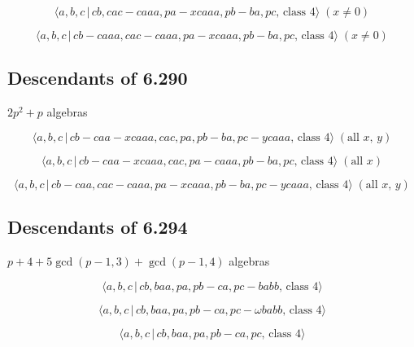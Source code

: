 \documentclass[10pt]{article}
\begin{document}
\begin{equation}
\langle a,b,c\,|\,cb,cac-caaa,pa-xcaaa,pb-ba,pc,\,\text{class }4\rangle \;(x
\neq 0)  \tag{7.2304}
\end{equation}

\begin{equation}
\langle a,b,c\,|\,cb-caaa,cac-caaa,pa-xcaaa,pb-ba,pc,\,\text{class }4\rangle
\;(x \neq 0)  \tag{7.2305}
\end{equation}

\subsection{Descendants of 6.290}

$2p^{2}+p$ algebras

\begin{equation}
\langle a,b,c\,|\,cb-caa-xcaaa,cac,pa,pb-ba,pc-ycaaa,\,\text{class }4\rangle
\;(\text{all }x,\,y)  \tag{7.2306}
\end{equation}

\begin{equation}
\langle a,b,c\,|\,cb-caa-xcaaa,cac,pa-caaa,pb-ba,pc,\,\text{class }4\rangle
\;(\text{all }x)  \tag{7.2307}
\end{equation}

\begin{equation}
\langle a,b,c\,|\,cb-caa,cac-caaa,pa-xcaaa,pb-ba,pc-ycaaa,\,\text{class }%
4\rangle \;(\text{all }x,\,y)  \tag{7.2308}
\end{equation}

\subsection{Descendants of 6.294}

$p+4+5\gcd (p-1,3)+\gcd (p-1,4)$ algebras

\begin{equation}
\langle a,b,c\,|\,cb,baa,pa,pb-ca,pc-babb,\,\text{class }4\rangle 
\tag{7.2309}
\end{equation}

\begin{equation}
\langle a,b,c\,|\,cb,baa,pa,pb-ca,pc-\omega babb,\,\text{class }4\rangle 
\tag{7.2310}
\end{equation}

\begin{equation}
\langle a,b,c\,|\,cb,baa,pa,pb-ca,pc,\,\text{class }4\rangle  \tag{7.2311}
\end{equation}
\end{document}

